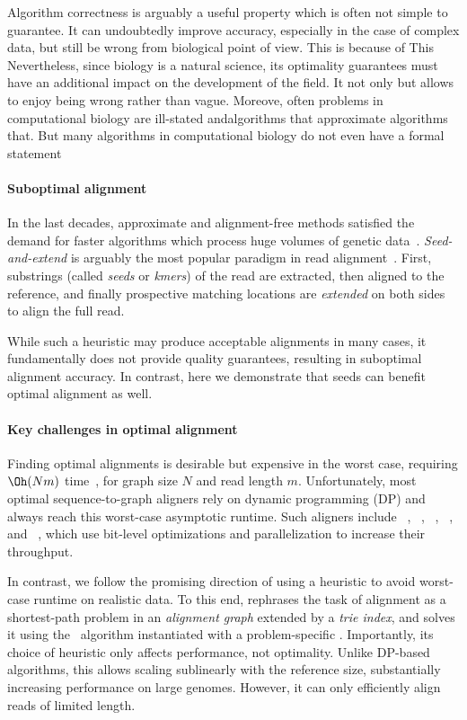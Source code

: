 Algorithm correctness is arguably a useful property which is often not simple to
guarantee. It can undoubtedly improve accuracy, especially in the case of
complex data, but still be wrong from biological point of view. This is because
of  This Nevertheless, since biology is a natural science, its  optimality
guarantees must have an additional impact on the development of the field. It
not only but allows to enjoy being wrong rather than vague. Moreove, often
problems in computational biology are ill-stated andalgorithms that approximate
algorithms that. But many algorithms in computational biology do not even have a
formal statement 

\paragraph{Suboptimal alignment}
%
In the last decades, approximate and alignment-free methods satisfied the demand
for faster algorithms which process huge volumes of genetic
data~\citep{kucherov2019evolution}. 
%
\emph{Seed-and-extend} is arguably the most popular paradigm in read
alignment~\citep{altschul_basic_1990,langmead_fast_2012,li_fast_2009}. First,
substrings (called \emph{seeds} or \emph{kmers}) of the read are extracted, then
aligned to the reference, and finally prospective matching locations are
\emph{extended} on both sides to align the full read.

While such a heuristic may produce acceptable alignments in many cases, it
fundamentally does not provide quality guarantees, resulting in suboptimal
alignment accuracy.
%
In contrast, here we demonstrate that seeds can benefit optimal alignment as
well.

\paragraph{Key challenges in optimal alignment}
%
Finding optimal alignments is desirable but expensive in the worst case,
requiring $\Oh(Nm)$ time~\citep{equi2019complexity}, for graph size $N$ and read
length $m$.
%
Unfortunately, most optimal sequence-to-graph aligners rely on dynamic
programming (DP) and always reach this worst-case asymptotic runtime. Such
aligners include \vargas~\citep{darby2020vargas},
\pasgal~\citep{jain_accelerating_2019},
\graphaligner~\citep{rautiainen_bitparallel_2019},
\hga~\citep{feng2021accelerating}, and \vg~\citep{garrison_variation_2018},
which use bit-level optimizations and parallelization to increase their
throughput.

In contrast, we follow the promising direction of using a heuristic to avoid
worst-case runtime on realistic data. To this end, \astarix rephrases the task
of alignment as a shortest-path problem in an \emph{alignment graph} extended by
a \emph{trie index}, and solves it using the \A~algorithm instantiated with a
problem-specific \prefixh. Importantly, its choice of heuristic only affects
performance, not optimality.
%
Unlike DP-based algorithms, this \prefixh allows scaling sublinearly with the
reference size, substantially increasing performance on large genomes. However,
it can only efficiently align reads of limited length.